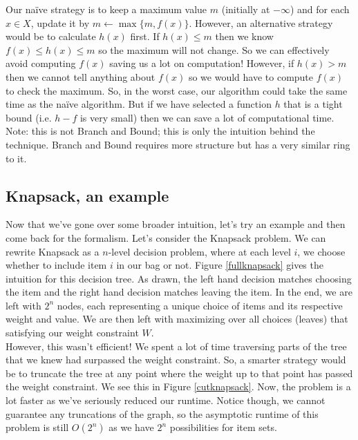 \documentclass[10pt]{article}
\theoremstyle{plain}
\theoremstyle{definition}
\numberwithin{equation}{section}
\numberwithin{figure}{section}
\begin{document}
\noindent Our na\"ive strategy is to keep a maximum value $m$ (initially at $-\infty$) and for each $x \in X$, update it by $m \leftarrow \max \{m, f(x)\}$. However, an alternative strategy would be to calculate $h(x)$ first. If $h(x) \leq m$ then we know $f(x) \leq h(x) \leq m$ so the maximum will not change. So we can effectively avoid computing $f(x)$ saving us a lot on computation! However, if $h(x) > m$ then we cannot tell anything about $f(x)$ so we would have to compute $f(x)$ to check the maximum. So, in the worst case, our algorithm could take the same time as the na\"ive algorithm. But if we have selected a function $h$ that is a tight bound (i.e. $h - f$ is very small) then we can save a lot of computational time. \\

\noindent Note: this is not Branch and Bound; this is only the intuition behind the technique. Branch and Bound requires more structure but has a very similar ring to it.

\subsection{Knapsack, an example}
Now that we've gone over some broader intuition, let's try an example and then come back for the formalism. Let's consider the Knapsack problem. We can rewrite Knapsack as a $n$-level decision problem, where at each level $i$, we choose whether to include item $i$ in our bag or not. Figure \ref{fullknapsack} gives the intuition for this decision tree. As drawn, the left hand decision matches choosing the item and the right hand decision matches leaving the item. In the end, we are left with $2^n$ nodes, each representing a unique choice of items and its respective weight and value. We are then left with maximizing over all choices (leaves) that satisfying our weight constraint $W$. \\

\noindent However, this wasn't efficient! We spent a lot of time traversing parts of the tree that we knew had surpassed the weight constraint. So, a smarter strategy would be to truncate the tree at any point where the weight up to that point has passed the weight constraint. We see this in Figure \ref{cutknapsack}. Now, the problem is a lot faster as we've seriously reduced our runtime.  Notice though, we cannot guarantee any truncations of the graph, so the asymptotic runtime of this problem is still $O(2^n)$ as we have $2^n$ possibilities for item sets.
\end{document}
